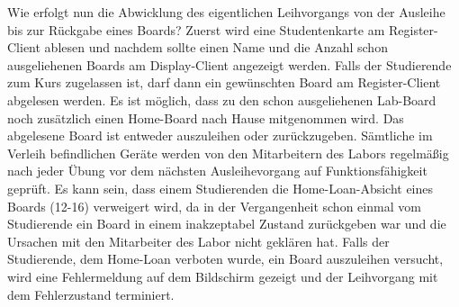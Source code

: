 Wie erfolgt nun die Abwicklung des eigentlichen Leihvorgangs von der Ausleihe bis zur Rückgabe eines Boards?  Zuerst wird eine Studentenkarte am Register-Client ablesen und nachdem sollte einen Name und die Anzahl schon ausgeliehenen Boards am Display-Client angezeigt werden. Falls der Studierende zum Kurs zugelassen ist, darf dann ein gewünschten Board am Register-Client abgelesen werden. Es ist möglich, dass zu den schon ausgeliehenen Lab-Board noch zusätzlich einen Home-Board nach Hause mitgenommen wird. Das abgelesene Board ist entweder auszuleihen oder zurückzugeben. Sämtliche im Verleih befindlichen Geräte werden von den Mitarbeitern des Labors regelmäßig nach jeder Übung vor dem nächsten Ausleihevorgang auf Funktionsfähigkeit geprüft. Es kann sein, dass einem Studierenden die Home-Loan-Absicht eines Boards (12-16) verweigert wird, da in der Vergangenheit schon einmal vom Studierende ein Board in einem inakzeptabel Zustand zurückgeben war und die Ursachen mit den Mitarbeiter des Labor nicht geklären hat. Falls der Studierende, dem Home-Loan verboten wurde, ein Board auszuleihen versucht, wird eine Fehlermeldung auf dem Bildschirm gezeigt und der Leihvorgang mit dem Fehlerzustand terminiert.  

